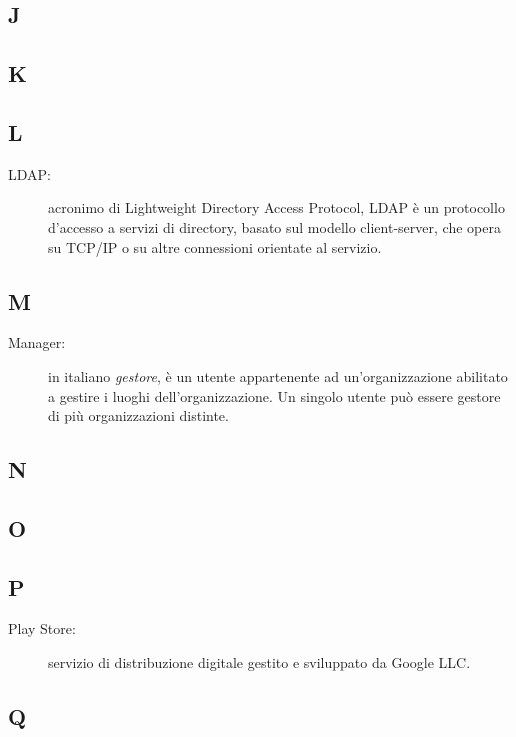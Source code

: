 \documentclass[../manuale-utente.tex]{subfiles}
\begin{document}
\subsection{J}

\subsection{K}

\subsection{L}
\begin{description}
  \item[LDAP:] acronimo di Lightweight Directory Access Protocol, LDAP è un protocollo d'accesso a servizi di directory, basato sul modello client-server, che opera su TCP/IP o su altre connessioni orientate al servizio.
\end{description}

\subsection{M}
\begin{description}
    \item[Manager:] in italiano \textit{gestore}, è un utente appartenente ad un'organizzazione abilitato a gestire i luoghi dell'organizzazione. Un singolo utente può essere gestore di più organizzazioni distinte.
\end{description}

\subsection{N}

\subsection{O}

\subsection{P}
\begin{description}
    \item[Play Store:] servizio di distribuzione digitale gestito e sviluppato da Google LLC\@.
\end{description}

\subsection{Q}
\end{document}
